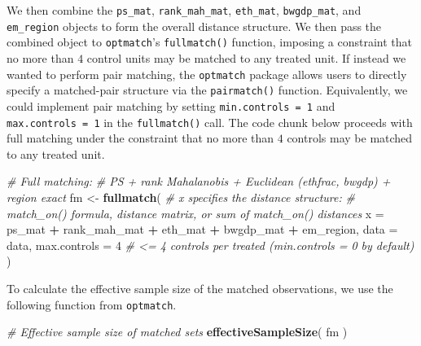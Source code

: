 \documentclass[
  12pt,
  leqno]{article}
\newenvironment{Shaded}{\begin{snugshade}}{\end{snugshade}}
\newcommand{\AttributeTok}[1]{\textcolor[rgb]{0.13,0.29,0.53}{#1}}
\newcommand{\CommentTok}[1]{\textcolor[rgb]{0.56,0.35,0.01}{\textit{#1}}}
\newcommand{\DecValTok}[1]{\textcolor[rgb]{0.00,0.00,0.81}{#1}}
\newcommand{\FunctionTok}[1]{\textcolor[rgb]{0.13,0.29,0.53}{\textbf{#1}}}
\newcommand{\NormalTok}[1]{#1}
\newcommand{\OtherTok}[1]{\textcolor[rgb]{0.56,0.35,0.01}{#1}}
\newcommand{\SpecialCharTok}[1]{\textcolor[rgb]{0.81,0.36,0.00}{\textbf{#1}}}
\begin{document}
\doublespacing

We then combine the \texttt{ps\_mat}, \texttt{rank\_mah\_mat},
\texttt{eth\_mat}, \texttt{bwgdp\_mat}, and \texttt{em\_region} objects
to form the overall distance structure. We then pass the combined object
to \texttt{optmatch}'s \texttt{fullmatch()} function, imposing a
constraint that no more than \(4\) control units may be matched to any
treated unit. If instead we wanted to perform pair matching, the
\texttt{optmatch} package allows users to directly specify a
matched-pair structure via the \texttt{pairmatch()} function.
Equivalently, we could implement pair matching by setting
\texttt{min.controls\ =\ 1} and \texttt{max.controls\ =\ 1} in the
\texttt{fullmatch()} call. The code chunk below proceeds with full
matching under the constraint that no more than \(4\) controls may be
matched to any treated unit.

\singlespacing

\begin{Shaded}
\begin{Highlighting}[]
\CommentTok{\# Full matching: }
\CommentTok{\# PS + rank Mahalanobis + Euclidean (ethfrac, bwgdp) + region exact}
\NormalTok{fm }\OtherTok{\textless{}{-}} \FunctionTok{fullmatch}\NormalTok{(}
\CommentTok{\# x specifies the distance structure:}
\CommentTok{\# match\_on() formula, distance matrix, or sum of match\_on() distances}
  \AttributeTok{x            =}\NormalTok{ ps\_mat }\SpecialCharTok{+}\NormalTok{ rank\_mah\_mat }\SpecialCharTok{+}\NormalTok{ eth\_mat }\SpecialCharTok{+}\NormalTok{ bwgdp\_mat }\SpecialCharTok{+}\NormalTok{ em\_region,}
  \AttributeTok{data         =}\NormalTok{ data,}
  \AttributeTok{max.controls =} \DecValTok{4} \CommentTok{\# \textless{}= 4 controls per treated (min.controls = 0 by default)}
\NormalTok{)}
\end{Highlighting}
\end{Shaded}

\doublespacing

To calculate the effective sample size of the matched observations, we
use the following function from \texttt{optmatch}.

\singlespacing

\begin{Shaded}
\begin{Highlighting}[]
\CommentTok{\# Effective sample size of matched sets}
\FunctionTok{effectiveSampleSize}\NormalTok{(}
\NormalTok{  fm}
\NormalTok{)}
\end{Highlighting}
\end{Shaded}
\end{document}
